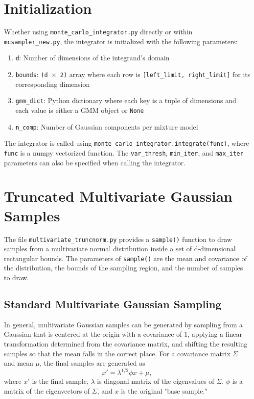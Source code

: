 \documentclass{article}
\begin{document}
\section{Initialization}

Whether using \texttt{monte\_carlo\_integrator.py} directly or within
\texttt{mcsampler\_new.py}, the integrator is initialized with the following
parameters:

\begin{enumerate}

\item \texttt{d}: Number of dimensions of the integrand's domain

\item \texttt{bounds}: \texttt{(d $\times$ 2)} array where each row is
\texttt{[left\_limit, right\_limit]} for its corresponding dimension

\item \texttt{gmm\_dict}: Python dictionary where each key is a tuple of
dimensions and each value is either a GMM object or \texttt{None}

\item \texttt{n\_comp}: Number of Gaussian components per mixture model

\end{enumerate}
The integrator is called using \texttt{monte\_carlo\_integrator.integrate(func)},
where \texttt{func} is a numpy vectorized function. The \texttt{var\_thresh},
\texttt{min\_iter}, and \texttt{max\_iter} parameters can also be specified when
calling the integrator.

\section{Truncated Multivariate Gaussian Samples}

The file \texttt{multivariate\_truncnorm.py} provides a \texttt{sample()}
function to draw samples from a multivariate normal distribution inside a set of
d-dimensional rectangular bounds. The parameters of \texttt{sample()} are the
mean and covariance of the distribution, the bounds of the sampling region, and
the number of samples to draw.

\subsection{Standard Multivariate Gaussian Sampling}

In general, multivariate Gaussian samples can be generated by sampling from a
Gaussian that is centered at the origin with a covariance of 1, applying a
linear transformation determined from the covariance matrix, and shifting the
resulting samples so that the mean falls in the correct place. For a covariance
matrix $\Sigma$ and mean $\mu$, the final samples are generated as
\begin{equation}
    x' = \lambda^{1/2} \phi x + \mu,
\end{equation}
where $x'$ is the final sample, $\lambda$ is diagonal matrix of the eigenvalues
of $\Sigma$, $\phi$ is a matrix of the eigenvectors of $\Sigma$, and $x$ is the
original "base sample." \\
\end{document}
